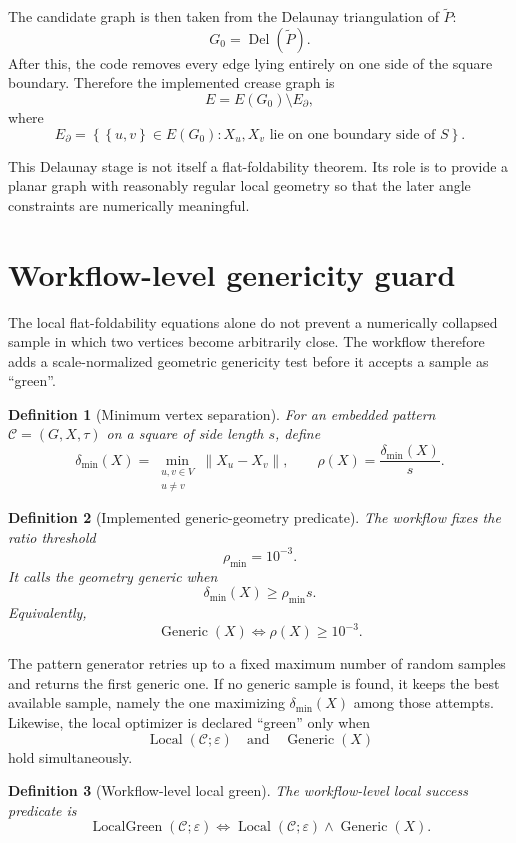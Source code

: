 \documentclass[11pt]{article}
\newtheorem{definition}{Definition}[section]
\theoremstyle{remark}
\newcommand{\CP}{\mathcal{C}}
\newcommand{\eps}{\varepsilon}
\newcommand{\norm}[1]{\left\lVert #1 \right\rVert}
\newcommand{\set}[1]{\left\{ #1 \right\}}
\begin{document}
The candidate graph is then taken from the Delaunay triangulation of
$\widetilde P$:
\[
G_0=\operatorname{Del}(\widetilde P).
\]
After this, the code removes every edge lying entirely on one side of the
square boundary. Therefore the implemented crease graph is
\[
E=E(G_0)\setminus E_{\partial},
\]
where
\[
E_{\partial}
=
\set{
\set{u,v}\in E(G_0):
X_u,X_v \text{ lie on one boundary side of }S
}.
\]

This Delaunay stage is not itself a flat-foldability theorem. Its role is to
provide a planar graph with reasonably regular local geometry so that the later
angle constraints are numerically meaningful.

\section{Workflow-level genericity guard}

The local flat-foldability equations alone do not prevent a numerically
collapsed sample in which two vertices become arbitrarily close. The workflow
therefore adds a scale-normalized geometric genericity test before it accepts a
sample as ``green''.

\begin{definition}[Minimum vertex separation]
For an embedded pattern $\CP=(G,X,\tau)$ on a square of side length $s$, define
\[
\delta_{\min}(X)
=
\min_{\substack{u,v\in V\\u\ne v}}
\norm{X_u-X_v},
\qquad
\rho(X)=\frac{\delta_{\min}(X)}{s}.
\]
\end{definition}

\begin{definition}[Implemented generic-geometry predicate]
The workflow fixes the ratio threshold
\[
\rho_{\min}=10^{-3}.
\]
It calls the geometry \emph{generic} when
\[
\delta_{\min}(X)\ge \rho_{\min}s.
\]
Equivalently,
\[
\operatorname{Generic}(X)
\Longleftrightarrow
\rho(X)\ge 10^{-3}.
\]
\end{definition}

The pattern generator retries up to a fixed maximum number of random samples
and returns the first generic one. If no generic sample is found, it keeps the
best available sample, namely the one maximizing $\delta_{\min}(X)$ among those
attempts. Likewise, the local optimizer is declared ``green'' only when
\[
\operatorname{Local}(\CP;\eps)
\quad\text{and}\quad
\operatorname{Generic}(X)
\]
hold simultaneously.

\begin{definition}[Workflow-level local green]
The workflow-level local success predicate is
\[
\operatorname{LocalGreen}(\CP;\eps)
\Longleftrightarrow
\operatorname{Local}(\CP;\eps)\wedge \operatorname{Generic}(X).
\]
\end{definition}
\end{document}
